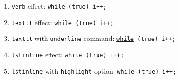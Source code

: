 \documentclass[preview]{standalone}
\begin{document}
\begin{enumerate}
\item \verb|verb| effect: \verb|while (true) i++;|
\item \verb|texttt| effect: \texttt{while (true) i++;}
\item \verb|texttt| with \verb|underline| command: \texttt{\underline{while} (true) i++;}
\item \verb|lstinline| effect: \lstinline{while (true) i++;}
\item \verb|lstinline| with \verb|highlight| option: \lstinline[style=inline-hl]{while (true) i++;}
\end{enumerate}
\end{document}
